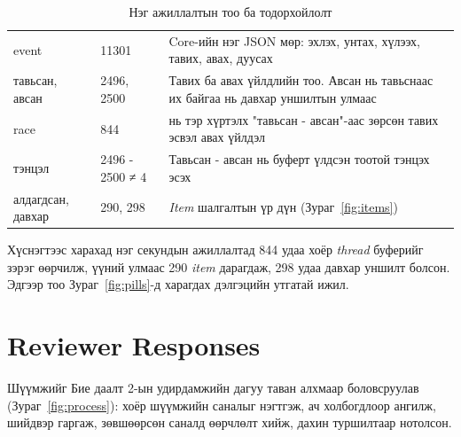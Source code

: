 \documentclass[12pt,a4paper]{article}
\newcommand{\term}[1]{\textit{#1}} %
\begin{document}
\begin{table}[H]\centering\small
\caption{Нэг ажиллалтын тоо ба тодорхойлолт}\label{tab:numbers}
\begin{tabular}{|L{0.2\textwidth}|L{0.16\textwidth}|L{0.64\textwidth}|}\hline
{} &  &  \\\hline
event & 11301 & Core-ийн нэг JSON мөр: эхлэх, унтах, хүлээх, тавих, авах, дуусах \\\hline
тавьсан, авсан & 2496, 2500 & Тавих ба авах үйлдлийн тоо. Авсан нь тавьснаас их байгаа нь давхар уншилтын улмаас \\\hline
race & 844 &  нь тэр хүртэлх "тавьсан - авсан"-аас зөрсөн тавих эсвэл авах үйлдэл \\\hline
тэнцэл & 2496 - 2500 ≠ 4 & Тавьсан - авсан нь буферт үлдсэн тоотой тэнцэх эсэх \\\hline
алдагдсан, давхар & 290, 298 & \term{Item} шалгалтын үр дүн (Зураг~\ref{fig:items}) \\\hline
\end{tabular}
\end{table}

Хүснэгтээс харахад нэг секундын ажиллалтад 844 удаа хоёр \term{thread} буферийг зэрэг өөрчилж, үүний улмаас 290 \term{item} дарагдаж, 298 удаа давхар уншилт болсон. Эдгээр тоо Зураг~\ref{fig:pills}-д харагдах дэлгэцийн утгатай ижил.


\section{Reviewer Responses}

Шүүмжийг Бие даалт 2-ын удирдамжийн дагуу таван алхмаар боловсруулав (Зураг~\ref{fig:process}): хоёр шүүмжийн саналыг нэгтгэж, ач холбогдлоор ангилж, шийдвэр гаргаж, зөвшөөрсөн саналд өөрчлөлт хийж, дахин туршилтаар нотолсон.
\end{document}
